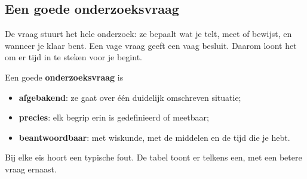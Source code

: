 \begin{oefeningen}
\end{oefeningen}

\subsection{Een goede onderzoeksvraag}

De vraag stuurt het hele onderzoek: ze bepaalt wat je telt, meet of bewijst, en wanneer je klaar bent. Een vage vraag geeft een vaag besluit. Daarom loont het om er tijd in te steken voor je begint.

\begin{theorie}
Een goede \textbf{\textcolor{accent}{onderzoeksvraag}} is
\begin{itemize}
\item \textbf{afgebakend}: ze gaat over één duidelijk omschreven situatie;
\item \textbf{precies}: elk begrip erin is gedefinieerd of meetbaar;
\item \textbf{beantwoordbaar}: met wiskunde, met de middelen en de tijd die je hebt.
\end{itemize}
\end{theorie}

Bij elke eis hoort een typische fout. De tabel toont er telkens een, met een betere vraag ernaast.


